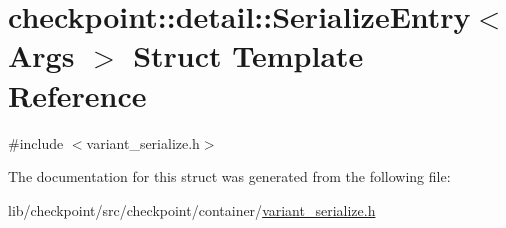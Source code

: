 \hypertarget{structcheckpoint_1_1detail_1_1_serialize_entry}{}\section{checkpoint\+:\+:detail\+:\+:Serialize\+Entry$<$ Args $>$ Struct Template Reference}
\label{structcheckpoint_1_1detail_1_1_serialize_entry}


{\ttfamily \#include $<$variant\+\_\+serialize.\+h$>$}



The documentation for this struct was generated from the following file\+:\begin{DoxyCompactItemize}
\item 
lib/checkpoint/src/checkpoint/container/\hyperlink{variant__serialize_8h}{variant\+\_\+serialize.\+h}\end{DoxyCompactItemize}
